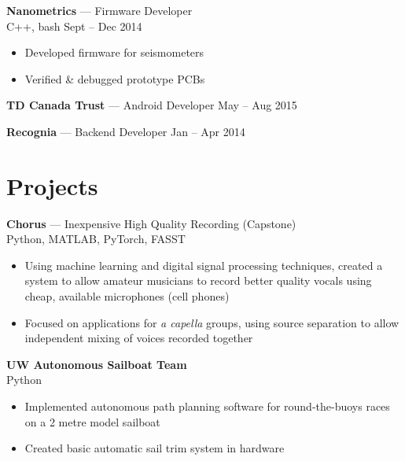 \documentclass[letterpaper,10pt]{article}
\newcommand{\comment}[1]{}
\begin{document}
\begin{minipage}[t]{0.6\textwidth}
{\large
\textbf{Nanometrics} --- Firmware Developer\\
}
{\footnotesize
C++, bash \hfill Sept -- Dec 2014
}
\begin{itemize}
    \item {Developed firmware for seismometers}
    \item {Verified \& debugged prototype PCBs}
\end{itemize}
\bigskip

{%
\textbf{TD Canada Trust} --- Android Developer \hfill {\footnotesize May -- Aug 2015}\\
}
\comment{
{\footnotesize
Java (Android), PostgreSQL \hfill May -- Aug 2015\\
}
\begin{itemize}
    \item{Prototyped Android apps to explore new technologies applied to banking (e.g. internet of things)}
\end{itemize}
}

{%
\textbf{Recognia} --- Backend Developer \hfill {\footnotesize Jan -- Apr 2014}\\
}
\comment{
{\footnotesize
Java, Perl, PostgreSQL, AngularJS \hfill Jan  -- Apr 2014\\
}
\begin{itemize}
    \item{Built backend \& API for website for technical analysis of financial instruments}
    \item{Created new caching strategy, reducing cache misses by 60\%}
\end{itemize}
}

\section{Projects}
\smallskip
{\large
\textbf{Chorus} --- Inexpensive High Quality Recording (Capstone) \\
}
{\footnotesize
Python, MATLAB, PyTorch, FASST
}
\begin{itemize}
	\item {Using machine learning and digital signal processing techniques, created a system to allow amateur musicians to record better quality vocals using cheap, available microphones (cell phones)}
    \item {Focused on applications for \textit{a capella} groups, using source separation to allow independent mixing of voices recorded together}
\end{itemize}

\bigskip

{\large
\textbf{UW Autonomous Sailboat Team}\\
}
{\footnotesize
Python
}
\begin{itemize}
	\item {Implemented autonomous path planning software for round-the-buoys races on a 2 metre model sailboat}
    \item {Created basic automatic sail trim system in hardware}
\end{itemize}


\end{minipage}
\end{document}
